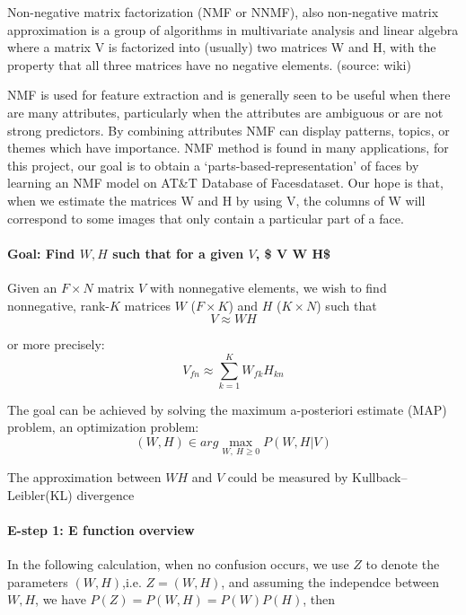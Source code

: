 \documentclass[11pt]{article}
\begin{document}
    Non-negative matrix factorization (NMF or NNMF), also non-negative
matrix approximation is a group of algorithms in multivariate analysis
and linear algebra where a matrix V is factorized into (usually) two
matrices W and H, with the property that all three matrices have no
negative elements. (source: wiki)

NMF is used for feature extraction and is generally seen to be useful
when there are many attributes, particularly when the attributes are
ambiguous or are not strong predictors. By combining attributes NMF can
display patterns, topics, or themes which have importance. NMF method is
found in many applications, for this project, our goal is to obtain a
`parts-based-representation' of faces by learning an NMF model on AT\&T
Database of Facesdataset. Our hope is that, when we estimate the
matrices W and H by using V, the columns of W will correspond to some
images that only contain a particular part of a face.

\paragraph{\texorpdfstring{Goal: Find \(W, H\) such that for a given
\(V\), \$ V \approx W
H\$}{Goal: Find W, H such that for a given V, \$ V W H\$}}\label{goal-find-w-h-such-that-for-a-given-v-v-w-h}

Given an \(F \times N\) matrix \(V\) with nonnegative elements, we wish
to find nonnegative, rank-\(K\) matrices \(W\) (\(F \times K\)) and
\(H\) (\(K \times N\)) such that \[ V \approx W H \]

or more precisely: \[ V_{fn} \approx \sum_{k = 1}^{K} W_{fk} H_{kn}\]

The goal can be achieved by solving the maximum a-posteriori estimate
(MAP) problem, an optimization problem:
\[ (W, H) \in  arg \max_{W,\  H \geq 0} P(W, H|V) \]

The approximation between \(WH\) and \(V\) could be measured by
Kullback--Leibler(KL) divergence

    \paragraph{E-step 1: E function
overview}\label{e-step-1-e-function-overview}

In the following calculation, when no confusion occurs, we use \(Z\) to
denote the parameters \((W, H)\),i.e. \(Z = (W, H)\), and assuming the
independce between \(W, H\), we have \(P(Z) = P(W, H) = P(W)P(H)\), then
\end{document}
